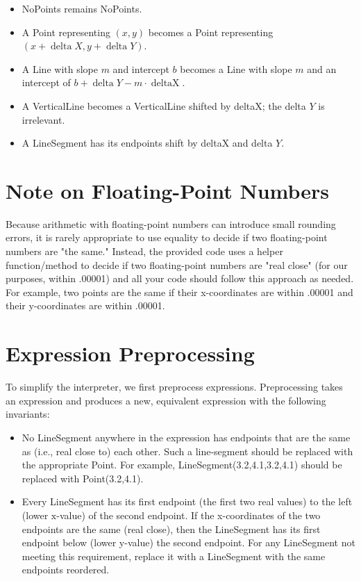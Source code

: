 \documentclass[a4paper,12pt]{article}
\begin{document}
\begin{itemize}
  \item \textrm{NoPoints} remains \textrm{NoPoints}.
  \item A \textrm{Point} representing $(x, y)$ becomes a \textrm{Point} representing $(x+\operatorname{delta} X, y+\operatorname{delta} Y)$.
  \item A \textrm{Line} with slope $m$ and intercept $b$ becomes a \textrm{Line} with slope $m$ and an intercept of $b+\operatorname{delta} Y-m \cdot \operatorname{deltaX}$.
  \item A \textrm{VerticalLine} becomes a \textrm{VerticalLine} shifted by deltaX; the delta $Y$ is irrelevant.
  \item A \textrm{LineSegment} has its endpoints shift by deltaX and delta $Y$.
\end{itemize}

\section*{Note on Floating-Point Numbers}
Because arithmetic with floating-point numbers can introduce small rounding errors, it is rarely appropriate to use equality to decide if two floating-point numbers are "the same." Instead, the provided code uses a helper function/method to decide if two floating-point numbers are "real close" (for our purposes, within .00001) and all your code should follow this approach as needed. For example, two points are the same if their x-coordinates are within .00001 and their y-coordinates are within .00001.

\section*{Expression Preprocessing}
To simplify the interpreter, we first preprocess expressions. Preprocessing takes an expression and produces a new, equivalent expression with the following invariants:

\begin{itemize}
  \item No \textrm{LineSegment} anywhere in the expression has endpoints that are the same as (i.e., real close to) each other. Such a line-segment should be replaced with the appropriate \textrm{Point}. For example, \textrm{LineSegment}(3.2,4.1,3.2,4.1) should be replaced with \textrm{Point}(3.2,4.1).
  \item Every \textrm{LineSegment} has its first endpoint (the first two real values) to the left (lower $\mathrm{x}$-value) of the second endpoint. If the x-coordinates of the two endpoints are the same (real close), then the \textrm{LineSegment} has its first endpoint below (lower y-value) the second endpoint. For any \textrm{LineSegment} not meeting this requirement, replace it with a \textrm{LineSegment} with the same endpoints reordered.
\end{itemize}
\end{document}
